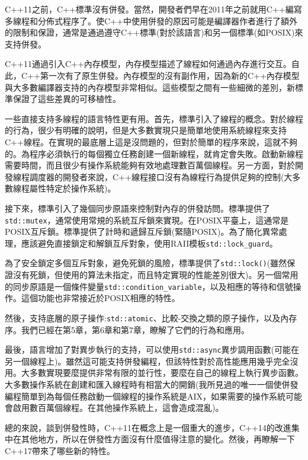 C++11之前，C++標準沒有併發。當然，開發者們早在2011年之前就用C++編寫多線程和分佈式程序了。使C++中使用併發的原因可能是編譯器作者進行了額外的限制和保證，通常是通過遵守C++標準(對於該語言)和另一個標準(如POSIX)來支持併發。

C++11通過引入C++內存模型，內存模型描述了線程如何通過內存進行交互。自此，C++第一次有了原生併發。內存模型的沒有副作用，因為新的C++內存模型與大多數編譯器支持的內存模型非常相似。這些模型之間有一些細微的差別，新標準保證了這些差異的可移植性。

一些直接支持多線程的語言特性更有用。首先，標準引入了線程的概念。對於線程的行為，很少有明確的說明，但是大多數實現只是簡單地使用系統線程來支持C++線程。在實現的最底層上這是沒問題的，但對於簡單的程序來說，這就不夠的。為程序必須執行的每個獨立任務創建一個新線程，就肯定會失敗。啟動新線程需要時間，而且很少有操作系統能夠有效地處理數百萬個線程。另一方面，對於開發線程調度器的開發者來說，C++線程接口沒有為線程行為提供足夠的控制(大多數線程屬性特定於操作系統)。

接下來，標準引入了幾個同步原語來控制對內存的併發訪問。標準提供了\texttt{std::mutex}，通常使用常規的系統互斥鎖來實現。在POSIX平臺上，這通常是POSIX互斥鎖。標準提供了計時和遞歸互斥鎖(緊隨POSIX)。為了簡化異常處理，應該避免直接鎖定和解鎖互斥對象，使用RAII模板\texttt{std::lock\_guard}。

為了安全鎖定多個互斥對象，避免死鎖的風險，標準提供了\texttt{std::lock()}(雖然保證沒有死鎖，但使用的算法未指定，而且特定實現的性能差別很大)。另一個常用的同步原語是一個條件變量\texttt{std::condition\_variable}，以及相應的等待和信號操作。這個功能也非常接近於POSIX相應的特性。

然後，支持底層的原子操作:\texttt{std::atomic}、比較-交換之類的原子操作，以及內存序。我們已經在第5章，第6章和第7章，瞭解了它們的行為和應用。

最後，語言增加了對異步執行的支持，可以使用\texttt{std::async}異步調用函數(可能在另一個線程上)。雖然這可能支持併發編程，但該特性對於高性能應用幾乎完全沒用。大多數實現要麼提供非常有限的並行性，要麼在自己的線程上執行異步函數。大多數操作系統在創建和匯入線程時有相當大的開銷(我所見過的唯一一個使併發編程簡單到為每個任務啟動一個線程的操作系統是AIX，如果需要的操作系統可能會啟用數百萬個線程。在其他操作系統上，這會造成混亂)。

總的來說，談到併發性時，C++11在概念上是一個重大的進步，C++14的改進集中在其他地方，所以在併發性方面沒有什麼值得注意的變化。然後，再瞭解一下C++17帶來了哪些新的特性。




































